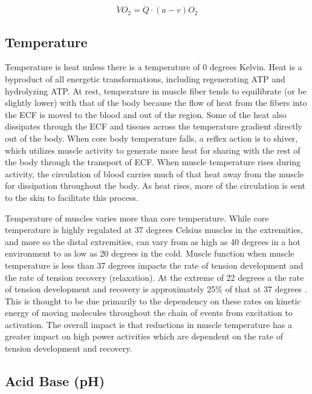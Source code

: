 \begin{equation}
    \dot{V}O_2 = \dot{Q} \cdot (a-v)O_2
    \label{FicksEquation}
\end{equation}


\subsection{Temperature}

Temperature is heat unless there is a temperature of 0 degrees Kelvin. Heat is a byproduct of all energetic transformations, including regenerating ATP and hydrolyzing ATP. At rest, temperature in muscle fiber tends to equilibrate (or be slightly lower) with that of the body because the flow of heat from the fibers into the ECF is moved to the blood and out of the region. Some of the heat also dissipates through the ECF and tissues across the temperature gradient directly out of the body. When core body temperature falls, a reflex action is to shiver, which utilizes muscle activity to generate more heat for sharing with the rest of the body through the transport of ECF. When muscle temperature rises during activity, the circulation of blood carries much of that heat away from the muscle for dissipation throughout the body. As heat rises, more of the circulation is sent to the skin to facilitate this process.

Temperature of muscles varies more than core temperature. While core temperature is highly regulated at 37 degrees Celsius muscles in the extremities, and more so the distal extremities, can vary from as high as 40 degrees in a hot environment to as low as 20 degrees in the cold. Muscle function when muscle temperature is less than 37 degrees impacts the rate of tension development and the rate of tension recovery (relaxation). At the extreme of 22 degrees a the rate of tension development and recovery is approximately 25\% of that at 37 degrees \cite{jones_skeletal_2006}. This is thought to be due primarily to the dependency on these rates on kinetic energy of moving molecules throughout the chain of events from excitation to activation. The overall impact is that reductions in muscle temperature has a greater impact on high power activities which are dependent on the rate of tension development and recovery.

\subsection{Acid Base (pH)}

